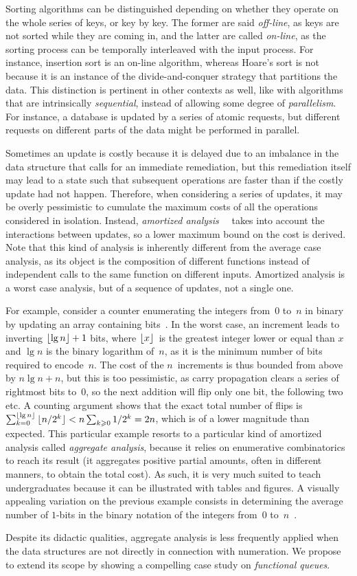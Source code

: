 Sorting algorithms can be distinguished depending on whether they
operate on the whole series of keys, or key by key. The former are
said \emph{off\hyp{}line}, as keys are not sorted while they are
coming in, and the latter are called \emph{on\hyp{}line}, as the
sorting process can be temporally interleaved with the input
process. For instance, insertion sort is an on\hyp{}line algorithm,
whereas Hoare's sort is not because it is an instance of the
divide\hyp{}and\hyp{}conquer strategy that partitions the data. This
distinction is pertinent in other contexts as well, like with
algorithms that are intrinsically \emph{sequential}, instead of
allowing some degree of \emph{parallelism}. For instance, a database
is updated by a series of atomic requests, but different requests on
different parts of the data might be performed in parallel.

Sometimes an update is costly because it is delayed due to an
imbalance in the data structure that calls for an immediate
remediation, but this remediation itself may lead to a state such that
subsequent operations are faster than if the costly update had not
happen. Therefore, when considering a series of updates, it may be
overly pessimistic to cumulate the maximum costs of all the operations
considered in isolation. Instead, \emph{amortized
  analysis}~\cite{Okasaki:1998}~\cite[\S{}17]{CLRS:2009} takes into
account the interactions between updates, so a lower maximum bound on
the cost is derived. Note that this kind of analysis is inherently
different from the average case analysis, as its object is the
composition of different functions instead of independent calls to the
same function on different inputs. Amortized analysis is a worst case
analysis, but of a sequence of updates, not a single one.

For example, consider a counter enumerating the integers from~\(0\)
to~\(n\) in binary by updating an array containing
bits~\cite[\S{}17.1]{CLRS:2009}. In the worst case, an increment leads
to inverting \(\lfloor{\lg n}\rfloor + 1\) bits, where \(\lfloor{x}\rfloor\)~is the
greatest integer lower or equal than \(x\) and \(\lg n\) is the binary
logarithm of~\(n\), as it is the minimum number of bits required to
encode~\(n\). The cost of the \(n\)~increments is thus bounded from
above by \(n\lg n + n\), but this is too pessimistic, as carry
propagation clears a series of rightmost bits to~\(0\), so the next
addition will flip only one bit, the following two etc. A counting
argument shows that the exact total number of flips is
\(\sum_{k=0}^{\lfloor{\lg n}\rfloor}{\lfloor{n/2^k}\rfloor} < n\sum_{k \geqslant
  0}{1/2^k} = 2n\), which is of a lower magnitude than expected. This
particular example resorts to a particular kind of amortized analysis
called \emph{aggregate analysis}, because it relies on enumerative
combinatorics~\cite{Martin:2001} to reach its result (it aggregates
positive partial amounts, often in different manners, to obtain the
total cost). As such, it is very much suited to teach undergraduates
because it can be illustrated with tables and figures. A visually
appealing variation on the previous example consists in determining
the average number of \(1\)-bits in the binary notation of the
integers from~\(0\) to~\(n\)~\cite{Bush:1940}.

Despite its didactic qualities, aggregate analysis is less frequently
applied when the data structures are not directly in connection with
numeration. We propose to extend its scope by showing a compelling
case study on \emph{functional queues}.


